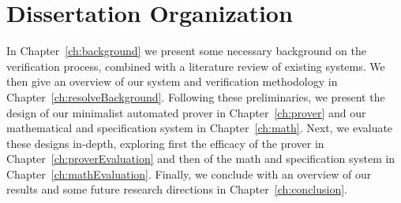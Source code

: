 \section{Dissertation Organization}
In Chapter~\ref{ch:background} we present some necessary background on the verification process, combined with a literature review of existing systems.  We then give an overview of our system and verification methodology in Chapter~\ref{ch:resolveBackground}.  Following these preliminaries, we present the design of our minimalist automated prover in Chapter~\ref{ch:prover} and our mathematical and specification system in Chapter~\ref{ch:math}.  Next, we evaluate these designs in-depth, exploring first the efficacy of the prover in Chapter~\ref{ch:proverEvaluation} and then of the math and specification system in Chapter~\ref{ch:mathEvaluation}.  Finally, we conclude with an overview of our results and some future research directions in Chapter~\ref{ch:conclusion}.
